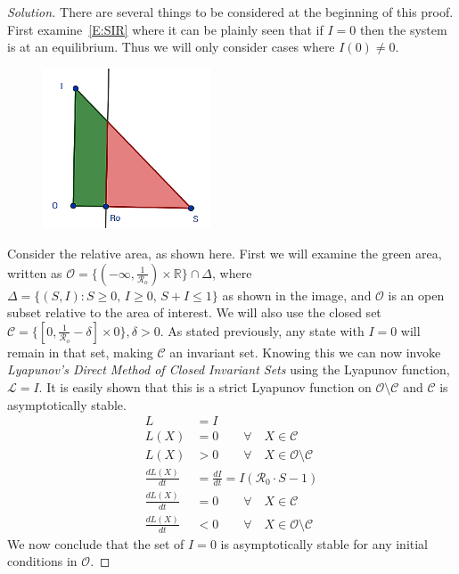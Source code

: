 \documentclass[12pt]{article}
\begin{document}
\begin{enumerate}[(a)]
{\begin{proof}[Solution]
There are several things to be considered at the beginning of this proof. First examine~\eqref{E:SIR} where it can be plainly seen that if $I=0$ then the system is at an equilibrium. Thus we will only consider cases where $I(0)\neq 0$.
\begin{center}
\begin{figure}[h]
\includegraphics[width=5cm]{images/4MB3_A1_2c.png}
\end{figure}
\end{center}
Consider the relative area, as shown here. First we will examine the green area, written as ${\mathcal O}=\{(-\infty,\frac{1}{{\mathcal R}_o}) \times \mathbb{R}\}\cap \Delta$, where $\Delta=\{(S,I):S\ge0,\, I\ge0,\, S+I\le1\}$ as shown in the image, and ${\mathcal O}$ is an open subset relative to the area of interest. We will also use the closed set ${\mathcal C}=\{[0,\frac{1}{{\mathcal R}_o}-\delta]\times{0}\}, \delta > 0$. As stated previously, any state with $I=0$ will remain in that set, making $\mathcal C$ an invariant set. Knowing this we can now invoke \textit{Lyapunov's Direct Method of Closed Invariant Sets} using the Lyapunov function, $\mathcal{L} = I$. It is easily shown that this is a strict Lyapunov function on $\mathcal{O} \setminus \mathcal{C}$ and $\mathcal{C}$ is asymptotically stable.
\begin{equation}
{\displaystyle {\begin{aligned}
L&=I \\
L(X)&=0 \qquad \forall \quad X \in \mathcal{C} \\
L(X) &> 0 \qquad \forall \quad X \in \mathcal{O} \setminus \mathcal{C} \\
\frac{dL(X)}{dt} &= \frac{dI}{dt}=I(\mathcal{R}_0 \cdot S-1) \\
\frac{dL(X)}{dt} &= 0 \qquad \forall \quad X \in \mathcal{C} \\
\frac{dL(X)}{dt} &< 0 \qquad \forall \quad X \in \mathcal{O} \setminus \mathcal{C}
\end{aligned}}}
\end{equation}
We now conclude that the set of $I=0$ is asymptotically stable for any initial conditions in $\mathcal{O}$.\break

\end{proof}}
\end{enumerate}
\end{document}
